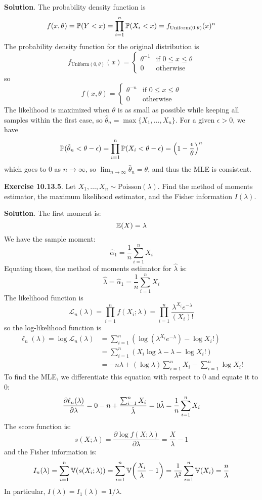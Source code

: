 \textbf{Solution}.
The probability density function is
\[
f(x, \theta) = \operatorname{\mathbb{P}}(Y < x) = \prod_{i = 1}^{n} \operatorname{\mathbb{P}}(X_{i} < x) = f_{\text{Uniform}(0, \theta)}(x)^{n}
\]
The probability density function for the original distribution is
\[
f_{\text{Uniform}(0, \theta)}(x) = \begin{cases}
\theta^{-1} & \text{if } 0 \leq x \leq \theta \\
0 & \text{otherwise}
\end{cases}
\]
so
\[
f(x, \theta) = \begin{cases}
\theta^{-n} & \text{if } 0 \leq x \leq \theta \\
0 & \text{otherwise}
\end{cases}
\]
The likelihood is maximized when \(\theta\) is as small as possible
while keeping all samples within the first case, so
\(\hat{\theta}_{n} = \max \{X_{1}, \dots, X_{n} \}\).
For a given \(\epsilon > 0\), we have
\[
\PROB(\hat{\theta}_{n} < \theta - \epsilon) = \prod_{i=1}^{n} \PROB(X_{i} < \theta - \epsilon) = \left(1 - \frac{\epsilon}{\theta} \right)^{n}
\]
which goes to 0 as \(n \rightarrow \infty\), so
\(\lim _{n \rightarrow \infty} \hat{\theta}_{n} = \theta\), and thus the
MLE is consistent.

\textbf{Exercise 10.13.5}. Let
\(X_{1}, \dots, X_{n} \sim \text{Poisson}(\lambda)\). Find the method of
moments estimator, the maximum likelihood estimator, and the Fisher
information \(I(\lambda)\).

\textbf{Solution}.
The first moment is:
\[
\operatorname{\mathbb{E}}(X) = \lambda
\]
We have the sample moment:
\[
\hat{\alpha}_{1} = \frac{1}{n} \sum_{i=1}^{n} X_{i}
\]
Equating those, the method of moments estimator for \(\hat{\lambda}\)
is:
\[
\hat{\lambda} = \hat{\alpha}_{1} = \frac{1}{n} \sum_{i=1}^{n} X_{i}
\]
The likelihood function is
\[
\mathcal{L}_{n}(\lambda) = \prod_{i=1}^{n} f(X_{i}; \lambda) = \prod_{i=1}^{n} \frac{\lambda^{X_{i}}e^{-\lambda}}{(X_{i})!}
\]
so the log-likelihood function is
\begin{align*}
\ell_{n}(\lambda) 
  = \log \mathcal{L}_{n}(\lambda) 
& = \sum_{i=1}^{n} (\log(\lambda^{X_{i}}e^{-\lambda}) - \log X_{i}!)
\\
& = \sum_{i=1}^{n} (X_{i} \log \lambda - \lambda - \log X_{i}!)
\\
& = -n \lambda + (\log \lambda) \sum_{i=1}^{n} X_{i} - \sum_{i=1}^{n} \log X_{i}!
\end{align*}
To find the MLE, we differentiate this equation with respect to 0 and
equate it to 0:
\[
\frac{\partial \ell_{n}(\lambda)}{\partial \lambda} = 0 \\
-n + \frac{\sum_{i=1}^{n} X_{i}}{\hat{\lambda}} = 0 \\
\hat{\lambda} = \frac{1}{n} \sum_{i=1}^{n} X_{i}
\]
The score function is:
\[
s(X; \lambda) = \frac{\partial \log f(X; \lambda)}{\partial \lambda} = \frac{X}{\lambda} - 1
\]
and the Fisher information is:
\[
I_{n}(\lambda) = \sum_{i=1}^{n} \VAR\left( s(X_{i}; \lambda) \right) 
= \sum_{i=1}^{n} \VAR \left( \frac{X_{i}}{\lambda} - 1 \right)
= \frac{1}{\lambda^{2}}  \sum_{i=1}^{n} \VAR(X_{i}) = \frac{n}{\lambda}
\]
In particular, \(I(\lambda) = I_{1}(\lambda) = 1 / \lambda\).

